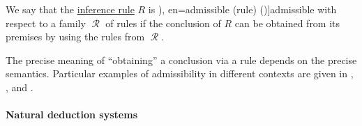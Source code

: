 \begin{concept}\label{con:inference_rule_admissibility}\mimprovised
  We say that the \hyperref[def:inference_rule]{inference rule} \( R \) is \term[ru=допустимое (правило) (\cite[252]{Герасимов2011Вычислимость}), en=admissible (rule) (\cite[76]{TroelstraSchwichtenberg2000BasicProofTheory})]{admissible} with respect to a family \( \mscrR \) of rules if the conclusion of \( R \) can be obtained from its premises by using the rules from \( \mscrR \).
\end{concept}
\begin{comments}
  \item The precise meaning of \enquote{obtaining} a conclusion via a rule depends on the precise semantics. Particular examples of admissibility in different contexts are given in , ,  and .
\end{comments}

\paragraph{Natural deduction systems}

